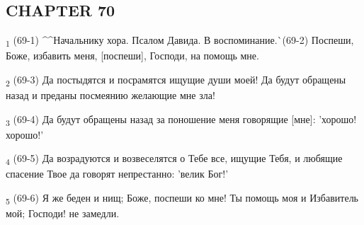 \subsection{CHAPTER 70}
\begin{tcolorbox}
\textsubscript{1} (69-1) ^^Начальнику хора. Псалом Давида. В воспоминание.^^ (69-2) Поспеши, Боже, избавить меня, [поспеши], Господи, на помощь мне.
\end{tcolorbox}
\begin{tcolorbox}
\textsubscript{2} (69-3) Да постыдятся и посрамятся ищущие души моей! Да будут обращены назад и преданы посмеянию желающие мне зла!
\end{tcolorbox}
\begin{tcolorbox}
\textsubscript{3} (69-4) Да будут обращены назад за поношение меня говорящие [мне]: 'хорошо! хорошо!'
\end{tcolorbox}
\begin{tcolorbox}
\textsubscript{4} (69-5) Да возрадуются и возвеселятся о Тебе все, ищущие Тебя, и любящие спасение Твое да говорят непрестанно: 'велик Бог!'
\end{tcolorbox}
\begin{tcolorbox}
\textsubscript{5} (69-6) Я же беден и нищ; Боже, поспеши ко мне! Ты помощь моя и Избавитель мой; Господи! не замедли.
\end{tcolorbox}
